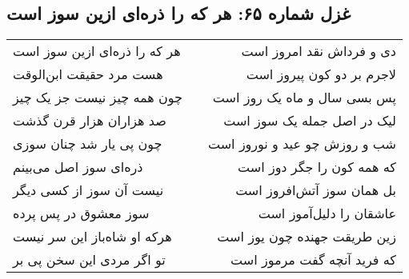 \begin{center}
\section*{غزل شماره ۶۵: هر که را ذره‌ای ازین سوز است}
\label{sec:065}
\begin{longtable}{l p{0.5cm} r}
هر که را ذره‌ای ازین سوز است
&&
دی و فرداش نقد امروز است
\\
هست مرد حقیقت ابن‌الوقت
&&
لاجرم بر دو کون پیروز است
\\
چون همه چیز نیست جز یک چیز
&&
پس بسی سال و ماه یک روز است
\\
صد هزاران هزار قرن گذشت
&&
لیک در اصل جمله یک سوز است
\\
چون پی یار شد چنان سوزی
&&
شب و روزش چو عید و نوروز است
\\
ذره‌ای سوز اصل می‌بینم
&&
که همه کون را جگر دوز است
\\
نیست آن سوز از کسی دیگر
&&
بل همان سوز آتش‌افروز است
\\
سوز معشوق در پس پرده
&&
عاشقان را دلیل‌آموز است
\\
هرکه او شاه‌باز این سر نیست
&&
زین طریقت جهنده چون یوز است
\\
تو اگر مردی این سخن پی بر
&&
که فرید آنچه گفت مرموز است
\\
\end{longtable}
\end{center}

